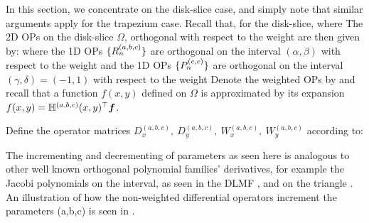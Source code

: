 In this section, we concentrate on the disk-slice case, and simply note that similar arguments apply for the trapezium case. Recall that, for the disk-slice,
where
The 2D OPs on the disk-slice $\Omega$, orthogonal with respect to the weight
are then given by:
where the 1D OPs $\{R^{(a, b, c)}_n\}$ are orthogonal on the interval $(\alpha, \beta)$ with respect to the weight
and the 1D OPs $\{{P}^{(c, c)}_n\}$ are orthogonal on the interval $(\gamma, \delta) = (-1, 1)$ with respect to the weight
Denote the weighted OPs by
and recall that a function $f(x,y)$ defined on $\Omega$ is approximated by its expansion $f(x,y) = \mathbb{H}^{(a,b,c)}(x,y)^\top \bm{f}$. 

\begin{definition}\label{def:ds:differentialoperators}
	Define the operator matrices $D_x^{(a,b,c)}, \: D_y^{(a,b,c)}, \: W_x^{(a,b,c)}, \: W_y^{(a,b,c)}$ according to:
\end{definition}

The incrementing and decrementing of parameters as seen here is analogous to other well known orthogonal polynomial families' derivatives, for example the Jacobi polynomials on the interval, as seen in the DLMF \cite[(18.9.3)]{DLMF}, and on the triangle \cite{olver2018recurrence}. An illustration of how the non-weighted differential operators increment the parameters (a,b,c) is seen in .

